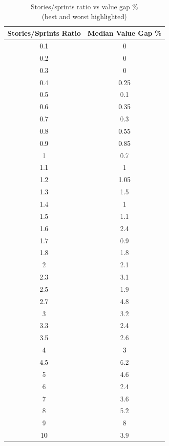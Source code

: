 \begin{table}[h!]
\centering
\caption{Stories/sprints ratio vs value gap \%\\(best and worst highlighted)}
\label{stories_sprints_ratio_vs_value_gap}
\begin{tabular}{|c|c|}
\hline
\textbf{Stories/Sprints Ratio} & \textbf{Median Value Gap \%} \\ \hline
\rowcolor[HTML]{67FD9A} 
0.1 & 0 \\ \hline
\rowcolor[HTML]{67FD9A} 
0.2 & 0 \\ \hline
\rowcolor[HTML]{67FD9A} 
0.3 & 0 \\ \hline
0.4 & 0.25 \\ \hline
0.5 & 0.1 \\ \hline
0.6 & 0.35 \\ \hline
0.7 & 0.3 \\ \hline
0.8 & 0.55 \\ \hline
0.9 & 0.85 \\ \hline
1 & 0.7 \\ \hline
1.1 & 1 \\ \hline
1.2 & 1.05 \\ \hline
1.3 & 1.5 \\ \hline
1.4 & 1 \\ \hline
1.5 & 1.1 \\ \hline
1.6 & 2.4 \\ \hline
1.7 & 0.9 \\ \hline
1.8 & 1.8 \\ \hline
2 & 2.1 \\ \hline
2.3 & 3.1 \\ \hline
2.5 & 1.9 \\ \hline
2.7 & 4.8 \\ \hline
3 & 3.2 \\ \hline
3.3 & 2.4 \\ \hline
3.5 & 2.6 \\ \hline
4 & 3 \\ \hline
4.5 & 6.2 \\ \hline
5 & 4.6 \\ \hline
6 & 2.4 \\ \hline
7 & 3.6 \\ \hline
8 & 5.2 \\ \hline
\rowcolor[HTML]{FD6864} 
9 & 8 \\ \hline
10 & 3.9 \\ \hline
\end{tabular}
\end{table}

